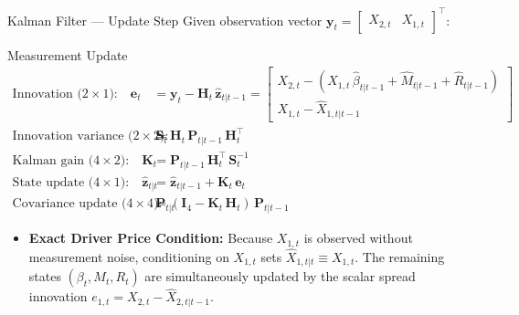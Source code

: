 \documentclass[10pt, aspectratio=169]{beamer}
\begin{document}
\begin{frame}{Kalman Filter --- Update Step}
  Given observation vector $\bm{y}_t = \begin{bmatrix}X_{2,t} & X_{1,t}\end{bmatrix}^\top$:
  \vspace{3pt}
  \begin{block}{Measurement Update}
    \begin{align}
      \text{Innovation ($2 \times 1$):}\quad \bm{e}_t &= \bm{y}_t - \bm{H}_t\,\hat{\bm{z}}_{t|t-1}
        = \begin{bmatrix} X_{2,t} - (X_{1,t}\,\hat{\beta}_{t|t-1} + \hat{M}_{t|t-1} + \hat{R}_{t|t-1}) \\
                          X_{1,t} - \hat{X}_{1,t|t-1} \end{bmatrix}
        \label{eq:innov}\\[3pt]
      \text{Innovation variance ($2 \times 2$):}\quad \bm{S}_t &= \bm{H}_t\,\bm{P}_{t|t-1}\,\bm{H}_t^\top
        \label{eq:innov_var}\\[3pt]
      \text{Kalman gain ($4 \times 2$):}\quad \bm{K}_t &= \bm{P}_{t|t-1}\,\bm{H}_t^\top\,\bm{S}_t^{-1}
        \label{eq:gain}\\[3pt]
      \text{State update ($4 \times 1$):}\quad \hat{\bm{z}}_{t|t} &= \hat{\bm{z}}_{t|t-1} + \bm{K}_t\,\bm{e}_t
        \label{eq:update_z}\\[3pt]
      \text{Covariance update ($4 \times 4$):}\quad \bm{P}_{t|t} &= (\bm{I}_4 - \bm{K}_t\,\bm{H}_t)\,\bm{P}_{t|t-1}
        \label{eq:update_P}
    \end{align}
  \end{block}
  \vspace{2pt}
  \begin{itemize}
    \item \textbf{Exact Driver Price Condition:} Because $X_{1,t}$ is observed without measurement noise,
          conditioning on $X_{1,t}$ sets $\hat{X}_{1,t|t} \equiv X_{1,t}$. The remaining states $(\beta_t, M_t, R_t)$
          are simultaneously updated by the scalar spread innovation $e_{1,t} = X_{2,t} - \hat{X}_{2,t|t-1}$.
  \end{itemize}
\end{frame}
\end{document}
